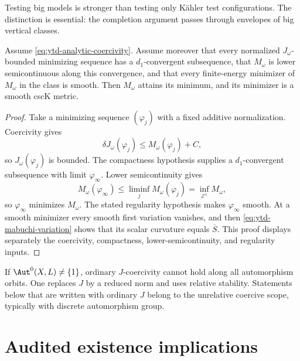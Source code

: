 Testing big models is stronger than testing only K\"ahler test
configurations. The distinction is essential: the completion argument
passes through envelopes of big vertical classes.

\begin{proposition}\label{prop:ytd-coercivity-minimizer}
Assume \eqref{eq:ytd-analytic-coercivity}. Assume moreover that every
normalized $J_\omega$-bounded minimizing sequence has a
$d_1$-convergent subsequence, that $M_\omega$ is lower semicontinuous
along this convergence, and that every finite-energy minimizer of
$M_\omega$ in the class is smooth. Then $M_\omega$ attains its minimum,
and its minimizer is a smooth cscK metric.
\end{proposition}

\begin{proof}
Take a minimizing sequence $(\varphi_j)$ with a fixed additive
normalization. Coercivity gives
\[
 \delta J_\omega(\varphi_j)
       \leq M_\omega(\varphi_j)+C,
\]
so $J_\omega(\varphi_j)$ is bounded. The compactness hypothesis supplies
a $d_1$-convergent subsequence with limit $\varphi_\infty$. Lower
semicontinuity gives
\[
 M_\omega(\varphi_\infty)
 \leq\liminf_jM_\omega(\varphi_j)
 =\inf_{\mathcal E^1}M_\omega,
\]
so $\varphi_\infty$ minimizes $M_\omega$. The stated regularity hypothesis makes $\varphi_\infty$ smooth. At a
smooth minimizer every smooth first variation vanishes, and then
\eqref{eq:ytd-mabuchi-variation} shows that its scalar curvature equals
$\overline S$. This proof displays separately the coercivity,
compactness, lower-semicontinuity, and regularity inputs.
\end{proof}

\begin{remark}
\label{rem:ytd-automorphisms}
If $\Aut^0(X,L)\neq\{1\}$, ordinary $J$-coercivity cannot hold
along all automorphism orbits. One replaces $J$ by a reduced norm
and uses relative stability. Statements below that are written with
ordinary $J$ belong to the unrelative coercive scope, typically with
discrete automorphism group.
\end{remark}

\section{Audited existence implications}
\label{sec:ytd-audited-implications}

